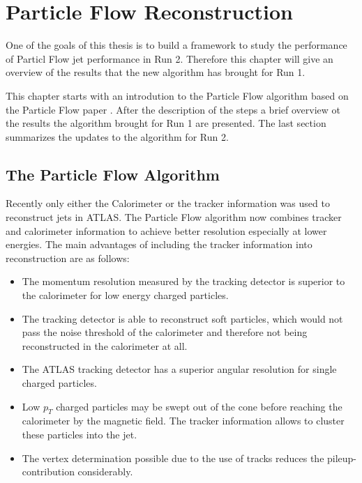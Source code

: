 \chapter{Particle Flow Reconstruction}

One of the goals of this thesis is to build a framework to study the performance of Particl Flow jet performance in Run 2. Therefore this chapter will give an overview of the results that the new algorithm has brought for Run 1.

This chapter starts with an introdution to the Particle Flow algorithm based on the Particle Flow paper \cite{pflow16}. After the description of the steps a brief overview ot the results the algorithm brought for Run 1 are presented. The last section summarizes the updates to the algorithm for Run 2.

\section{The Particle Flow Algorithm}

Recently only either the Calorimeter or the tracker information was used to reconstruct jets in ATLAS. The Particle Flow algorithm now combines tracker and calorimeter information to achieve better resolution especially at lower energies. The main advantages of including the tracker information into reconstruction are as follows:


\begin{itemize}
\item The momentum resolution measured by the tracking detector is superior to the calorimeter for low energy charged particles.
\item The tracking detector is able to reconstruct soft particles, which would not pass the noise threshold of the calorimeter and therefore not being reconstructed in the calorimeter at all.
\item The ATLAS tracking detector has a superior angular resolution for single charged particles.
\item Low $p_T$ charged particles may be swept out of the cone before reaching the calorimeter by the magnetic field. The tracker information allows to cluster these particles into the jet.
\item The vertex determination possible due to the use of tracks reduces the pileup-contribution considerably.
\end{itemize}

